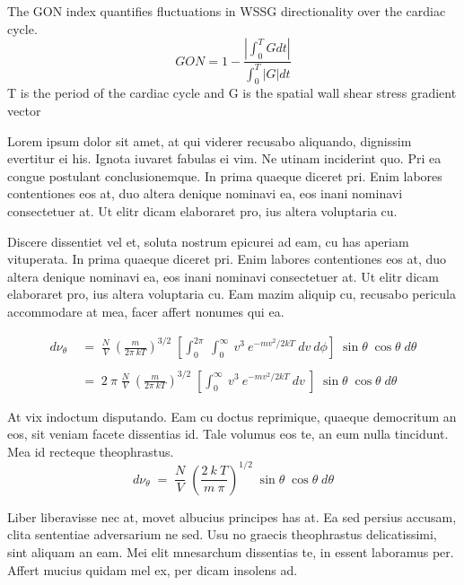 The GON index \cite{Shimogonya2009} quantifies fluctuations in WSSG directionality over the cardiac cycle. 
	\begin{equation}
GON=1-\frac{|\int_{0}^{T}Gdt|}{\int_{0}^{T}| G | dt}
	\end{equation}
T is the period of the cardiac cycle and G is the spatial wall shear stress gradient vector



Lorem ipsum dolor sit amet, at qui viderer recusabo aliquando, dignissim 
evertitur ei his. Ignota iuvaret fabulas ei vim. Ne utinam inciderint quo. 
Pri ea congue postulant conclusionemque. In prima quaeque diceret pri. Enim 
labores contentiones eos at, duo altera denique nominavi ea, eos inani 
nominavi consectetuer at. Ut elitr dicam elaboraret pro, ius altera 
voluptaria cu.

Discere dissentiet vel et, soluta nostrum epicurei ad eam, cu has aperiam 
vituperata. In prima quaeque diceret pri. Enim labores contentiones eos at, 
duo altera denique nominavi ea, eos inani nominavi consectetuer at. Ut elitr 
dicam elaboraret pro, ius altera voluptaria cu. Eam mazim aliquip cu, 
recusabo pericula accommodare at mea, facer affert nonumes qui ea.
\cite{LAPACK_00,FFTW3_00}

\begin{align*}
  d\nu_\theta &\;=\; \frac{N}{V}\:\left( \frac{m}{2\pi\:kT} \right)^{3/2}\;
                    \left[\int_{0}^{2\pi}\:\int_{0}^{\infty}\:v^3\:e^{-mv^2/2kT}\:dv\:d\phi \right]\;
                    \sin\theta\;\cos\theta\;d\theta \\\\
              &\;=\; 2\:\pi\;
                    \frac{N}{V}\:\left( \frac{m}{2\pi\:kT} \right)^{3/2}\;
                    \left[\int_{0}^{\infty}\:v^3\:e^{-mv^2/2kT}\:dv\: \right]\;
                    \sin\theta\;\cos\theta\;d\theta
\end{align*}

At vix indoctum disputando. Eam cu doctus reprimique, quaeque democritum 
an eos, sit veniam facete dissentias id. Tale volumus eos te, an eum nulla 
tincidunt. Mea id recteque theophrastus.
\begin{equation}
  d\nu_\theta \;=\; \frac{N}{V}\;\left(\frac{2\:k\:T}{m\:\pi} \right)^{1/2}\;
                  \sin\theta\;\cos\theta\;d\theta
  \label{CHAPTER3_EQN01}
\end{equation}

Liber liberavisse nec at, movet albucius principes has at. Ea sed persius 
accusam, clita sententiae adversarium ne sed. Usu no graecis theophrastus 
delicatissimi, sint aliquam an eam. Mei elit mnesarchum dissentias te, in 
essent laboramus per. Affert mucius quidam mel ex, per dicam insolens ad.

